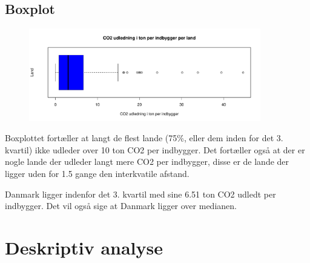 \documentclass{article}
\begin{document}
\subsection{Boxplot}

\begin{figure}[H]
  \centering
  \includegraphics[width=0.9\textwidth]{co2boxplot.pdf}
\end{figure}

Boxplottet fortæller at langt de flest lande (75\%, eller dem inden for det 3.
kvartil) ikke udleder over 10 ton CO2 per indbygger. Det fortæller også at der
er nogle lande der udleder langt mere CO2 per indbygger, disse er de lande der
ligger uden for 1.5 gange den interkvatile afstand.

Danmark ligger indenfor det 3. kvartil med sine 6.51 ton CO2 udledt per
indbygger. Det vil også sige at Danmark ligger over medianen.

\section{Deskriptiv analyse}
\end{document}
